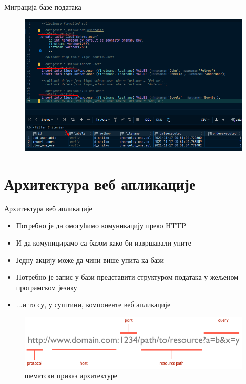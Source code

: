 \documentclass[aspectratio=169]{beamer}
\begin{document}
\begin{frame}[allowframebreaks]{Миграција базе података}
        \framebreak
        
        \begin{figure}
            \centering
            \includegraphics[width=\textwidth,height=0.8\textheight,keepaspectratio]{images/liquibase.png}
            \label{fig:liquibase}
        \end{figure}
    \end{frame}

    \section{Архитектура веб апликације}
    
    \begin{frame}[allowframebreaks]{Архитектура веб апликације}
        \begin{itemize}
            \item Потребно је да омогућимо комуникацију преко HTTP
            \item И да комуницирамо са базом како би извршавали упите
            \item Једну акцију може да чини више упита ка бази
            \item Потребно је запис у бази представити структуром података у жељеном програмском језику
            \item ...и то су, у суштини, компоненте веб апликације
        \end{itemize}
        
        \framebreak
        
        \begin{figure}
            \centering
            \includegraphics[width=\textwidth,height=\textheight,keepaspectratio]{images/url.png}
            \caption{шематски приказ архитектуре}
            \label{fig:arch}
        \end{figure}
    \end{frame}
    
\end{document}
